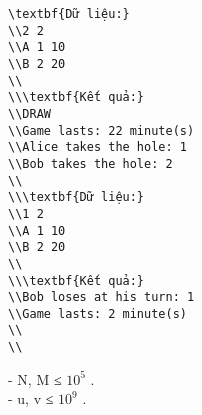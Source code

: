 \begin{verbatim}
\textbf{Dữ liệu:}
\\2 2
\\A 1 10
\\B 2 20
\\
\\\textbf{Kết quả:}
\\DRAW
\\Game lasts: 22 minute(s)
\\Alice takes the hole: 1
\\Bob takes the hole: 2
\\
\\\textbf{Dữ liệu:}
\\1 2
\\A 1 10
\\B 2 20
\\
\\\textbf{Kết quả:}
\\Bob loses at his turn: 1
\\Game lasts: 2 minute(s)
\\
\\\end{verbatim}
- N, M ≤ $10^{5}$   .   
\\   - u, v ≤ $10^{9}$   .